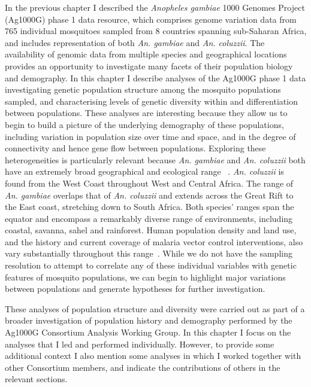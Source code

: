 \begin{refsection}
In the previous chapter I described the \textit{Anopheles gambiae} 1000 Genomes Project (Ag1000G) phase 1 data resource, which comprises genome variation data from 765 individual mosquitoes sampled from 8 countries spanning sub-Saharan Africa, and includes representation of both \textit{An. gambiae} and \textit{An. coluzzii}.
%
The availability of genomic data from multiple species and geographical locations provides an opportunity to investigate many facets of their population biology and demography.
%
In this chapter I describe analyses of the Ag1000G phase 1 data investigating genetic population structure among the mosquito populations sampled, and characterising levels of genetic diversity within and differentiation between populations.
%
These analyses are interesting because they allow us to begin to build a picture of the underlying demography of these populations, including variation in population size over time and space, and in the degree of connectivity and hence gene flow between populations.
%
Exploring these heterogeneities is particularly relevant because \textit{An. gambiae} and \textit{An. coluzzii} both have an extremely broad geographical and ecological range ~\parencite{dellaTorre2001,TeneFossog2015,Wiebe2017}.
%
\textit{An. coluzzii} is found from the West Coast throughout West and Central Africa.
%
The range of \textit{An. gambiae} overlaps that of \textit{An. coluzzii} and extends across the Great Rift to the East coast, stretching down to South Africa.
%
Both species' ranges span the equator and encompass a remarkably diverse range of environments, including coastal, savanna, sahel and rainforest.
%
Human population density and land use, and the history and current coverage of malaria vector control interventions, also vary substantially throughout this range~\parencite{BinswangerMkhize2017,WHO2019WMR}.
%
While we do not have the sampling resolution to attempt to correlate any of these individual variables with genetic features of mosquito populations, we can begin to highlight major variations between populations and generate hypotheses for further investigation.


These analyses of population structure and diversity were carried out as part of a broader investigation of population history and demography performed by the Ag1000G Consortium Analysis Working Group.
%
In this chapter I focus on the analyses that I led and performed individually.
%
However, to provide some additional context I also mention some analyses in which I worked together with other Consortium members, and indicate the contributions of others in the relevant sections.



\end{refsection}
